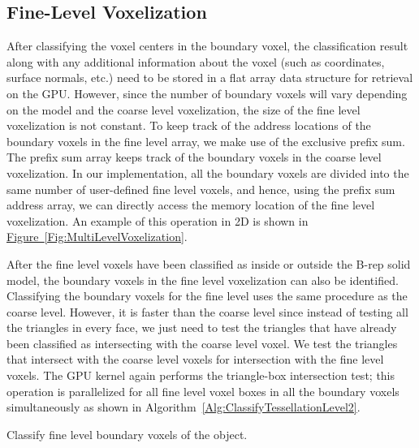 \documentclass[10pt,letterpaper]{article}
\newcommand{\cref}[2]{\hyperref[#2]{#1~\ref*{#2}}}
\begin{document}
\subsection{Fine-Level Voxelization}
After classifying the voxel centers in the boundary voxel, the classification result along with any additional information about the voxel (such as coordinates, surface normals, etc.) need to be stored in a flat array data structure for retrieval on the GPU. However, since the number of boundary voxels will vary depending on the model and the coarse level voxelization, the size of the fine level voxelization is not constant. To keep track of the address locations of the boundary voxels in the fine level array, we make use of the exclusive prefix sum. The prefix sum array keeps track of the boundary voxels in the coarse level voxelization. In our implementation, all the boundary voxels are divided into the same number of user-defined fine level voxels, and hence, using the prefix sum address array, we can directly access the memory location of the fine level voxelization. An example of this operation in 2D is shown in \cref{Figure}{Fig:MultiLevelVoxelization}.


After the fine level voxels have been classified as inside or outside the B-rep solid model, the boundary voxels in the fine level voxelization can also be identified. Classifying the boundary voxels for the fine level uses the same procedure as the coarse level. However, it is faster than the coarse level since instead of testing all the triangles in every face, we just need to test the triangles that have already been classified as intersecting with the coarse level voxel. We test the triangles that intersect with the coarse level voxels for intersection with the fine level voxels. The GPU kernel again performs the triangle-box intersection test; this operation is parallelized for all fine level voxel boxes in all the boundary voxels simultaneously as shown in Algorithm~\ref{Alg:ClassifyTessellationLevel2}.

\begin{algorithm}[h]
	\caption{Classify fine level boundary voxels of the object.}
	\label{Alg:ClassifyTessellationLevel2}
\end{algorithm}
\end{document}
